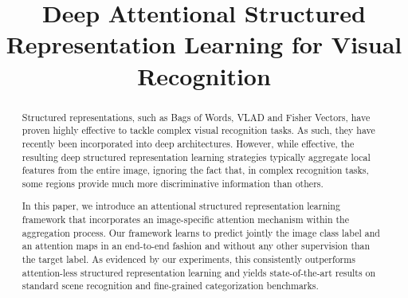 \documentclass{bmvc2k}
\title{Deep Attentional Structured Representation Learning for Visual Recognition}
\newcommand{\comment}[1]{}
\newcommand{\comment}[1]{}
\begin{document}
	
\maketitle
\begin{abstract}
Structured representations, such as Bags of Words, VLAD and Fisher Vectors, have proven highly effective to tackle complex visual recognition tasks. As such, they have recently been incorporated into deep architectures. However, while effective, the resulting deep structured representation learning strategies typically aggregate local features from the entire image, ignoring the fact that, in complex recognition tasks, some regions provide much more discriminative information than others.

In this paper, we introduce an attentional structured representation learning framework that incorporates an image-specific attention mechanism within the aggregation process. Our framework learns to predict jointly the image class label and an attention maps in an end-to-end fashion and without any other supervision than the target label. As evidenced by our experiments, this consistently outperforms attention-less structured representation learning and yields state-of-the-art results on standard scene recognition and fine-grained categorization benchmarks.

\comment{
Structured representations has proven highly effective to aggregate the local image descriptors by computing higher order statistics. Recent Convolutional Neural Networks, particularly NetVLAD, has modeled these representations as a learnable pooling layers showing great improvements. However, the individual VLAD encoded deep  CNN local feature vectors are typically aggregated uniformly, thereby not exploiting the discriminative power of certain semantic regions specific to the target label. 

In this work, we propose to model a discriminative attention-aware structured representation encoding by incorporating an image-specific attention mechanism. Importantly, we pose learning attention as an auxiliary task requiring no additional annotation. We incorporate the new soft-attentional weight into the structured layer and jointly optimize the complete system in an end-to-end manner.  Experiments show by integrating  attention mechanism to NetVLAD achieves state-of-art results on MIT-Indoor Scene dataset and competitive performance on three fine-grained datasets.
}
\end{abstract}
\end{document}
